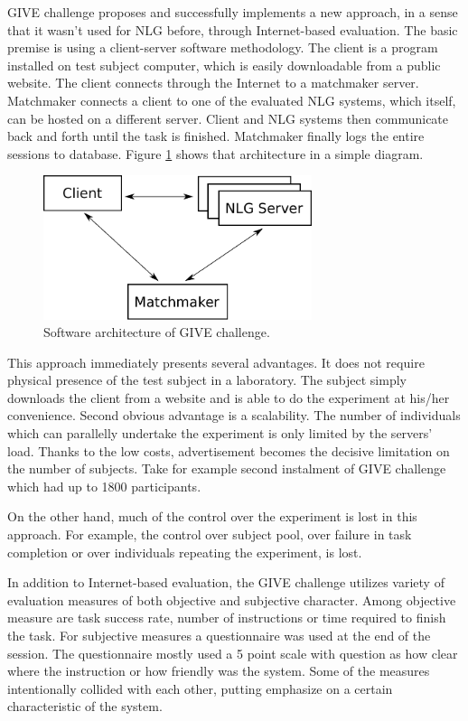 GIVE challenge proposes and successfully implements a new approach, in a sense that it wasn't used for NLG before, through Internet-based evaluation. The basic premise is using a client-server software methodology. The client is a program installed on test subject computer, which is easily downloadable from a public website. The client connects through the Internet to a matchmaker server. Matchmaker connects a client to one of the evaluated NLG systems, which itself, can be hosted on a different server. Client and NLG systems then communicate back and forth until the task is finished. Matchmaker finally logs the entire sessions to database. Figure \ref{fig:give-clientserver} shows that architecture in a simple diagram.

\begin{figure}[h]
  \centering
	\includegraphics[width=0.7\textwidth]{Images/give-client-servers}
	\caption{Software architecture of GIVE challenge.}
	\label{fig:give-clientserver}
\end{figure}

This approach immediately presents several advantages. It does not require physical presence of the test subject in a laboratory. The subject simply downloads the client from a website and is able to do the experiment at his/her convenience. Second obvious advantage is a scalability. The number of individuals which can parallelly undertake the experiment is only limited by the servers' load. Thanks to the low costs, advertisement becomes the decisive limitation on the number of subjects. Take for example second instalment of GIVE challenge which had up to 1800 participants.

On the other hand, much of the control over the experiment is lost in this approach. For example, the control over subject pool, over failure in task completion or over individuals repeating the experiment, is lost.

In addition to Internet-based evaluation, the GIVE challenge utilizes variety of evaluation measures of both objective and subjective character. Among objective measure are task success rate, number of instructions or time required to finish the task. For subjective measures a questionnaire was used at the end of the session. The questionnaire mostly used a 5 point scale with question as how clear where the instruction or how friendly was the system. Some of the measures intentionally collided with each other, putting emphasize on a certain characteristic of the system. 

